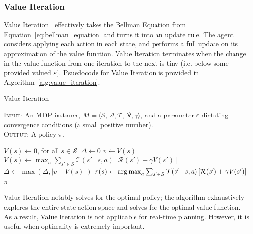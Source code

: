\documentclass[11pt]{article}
\begin{document}

\subsubsection{Value Iteration}


Value Iteration~\cite{bellman57} effectively takes the Bellman Equation from Equation~\ref{eq:bellman_equation} and turns it into an update rule. The agent considers applying each action in each state, and performs a full update on its approximation of the value function. Value Iteration terminates when the change in the value function from one iteration to the next is tiny (i.e. below some provided valued $\varepsilon$). Psuedocode for Value Iteration is provided in Algorithm~\ref{alg:value_iteration}.

\begin{algorithm}
\caption{Value Iteration}\label{alg:value_iteration}
\textsc{Input:} An MDP instance, $M = \langle \mathcal{S}, \mathcal{A}, \mathcal{T}, \mathcal{R}, \gamma \rangle$, and a parameter $\varepsilon$ dictating convergence conditions (a small positive number). \\
\textsc{Output:} A policy $\pi$.
\begin{algorithmic}[1]
\State $V(s) \gets 0$, for all $s \in \mathcal{S}$.
\State $\Delta \gets 0$
\While{$\Delta > \varepsilon$}
\State $v \gets V(s)$
\State $V(s) \gets \max_a \sum_{s' \in S} \mathcal{T}(s' \mid s, a) \left[\mathcal{R}(s') + \gamma V(s') \right]$
\State $\Delta \gets \max(\Delta, |v - V(s)|)$
\EndFor
\EndWhile
{}
\State $\pi(s) \gets \operatorname*{arg\,max}_a \sum_{s' \in S} \mathcal{T}(s' \mid s, a) \left[\mathcal{R}(s') + \gamma V(s') \right]$
\EndFor
{} $\pi$
\end{algorithmic}
\end{algorithm}

Value Iteration notably solves for the optimal policy; the algorithm exhaustively explores the entire state-action space and solves for the optimal value function. As a result, Value Iteration is not applicable for real-time planning. However, it is useful when optimality is extremely important.
\end{document}
